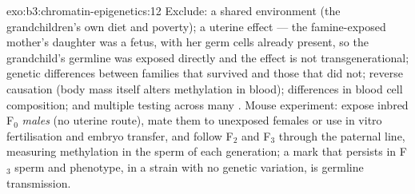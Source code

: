 \begin{solution}{exo:b3:chromatin-epigenetics:12}
Exclude: a shared environment (the grandchildren's own diet and
poverty); a uterine effect --- the famine-exposed mother's daughter was
a fetus, with her germ cells already present, so the grandchild's
germline was exposed directly and the effect is not transgenerational;
genetic differences between families that survived and those that did
not; reverse causation (body mass itself alters methylation in blood);
differences in blood cell composition; and multiple testing across many
. Mouse experiment: expose inbred F$_0$ \emph{males} (no uterine
route), mate them to unexposed females or use in vitro fertilisation
and embryo transfer, and follow F$_2$ and F$_3$ through the paternal
line, measuring methylation in the sperm of each generation; a mark
that persists in F$_3$ sperm and phenotype, in a strain with no genetic
variation, is germline transmission.
\end{solution}


